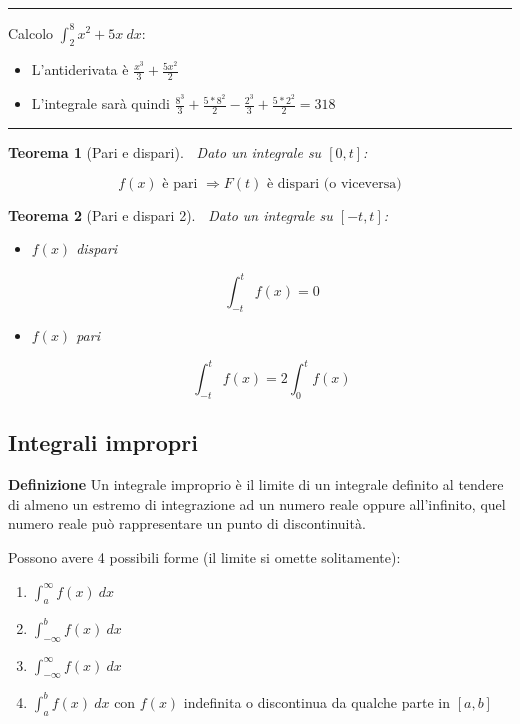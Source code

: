 \documentclass{article}
\newtheorem{theorem}{Teorema}
\begin{document}
\noindent\rule{\textwidth}{0.5pt}

\noindent Calcolo $\int_2^8x^2+5x\ dx$:
    \begin{itemize}
        \item L'antiderivata è $\frac{x^3}{3}+\frac{5x^2}{2}$
        \item L'integrale sarà quindi $\frac{8^3}{3}+\frac{5*8^2}{2}-\frac{2^3}{3}+\frac{5*2^2}{2}=318$
    \end{itemize}

\noindent\rule{\textwidth}{0.5pt}\newline

\begin{theorem}[Pari e dispari]$\ $\newline
    Dato un integrale su $[0,t]$:

    $$f(x)\text{ è pari }\Rightarrow F(t)\text{ è dispari\ \ \ \  (o viceversa)}$$\newline

\end{theorem}

\begin{theorem}[Pari e dispari 2]$\ $\newline
    Dato un integrale su $[-t,t]$:

    \begin{itemize}
        \item $f(x)$ dispari

        $$\int_{-t}^tf(x)=0$$

        \item $f(x)$ pari

        $$\int_{-t}^tf(x)=2\int_0^tf(x)$$\newline
        
    \end{itemize}

\end{theorem}

\subsection{Integrali impropri}

\textbf{Definizione} Un integrale improprio è il limite di un integrale definito al tendere di almeno un estremo di integrazione ad un numero reale oppure all'infinito, quel numero reale può rappresentare un punto di discontinuità.\newline 

\noindent Possono avere 4 possibili forme (il limite si omette solitamente):
\begin{enumerate}
    \item $\int_a^\infty f(x)\ dx$
    \item $\int_{-\infty}^b f(x)\ dx$
    \item $\int_{-\infty}^\infty f(x)\ dx$
    \item $\int_a^b f(x)\ dx$ con $f(x)$ indefinita o discontinua da qualche parte in $[a,b]$\newline
\end{enumerate}
\end{document}
